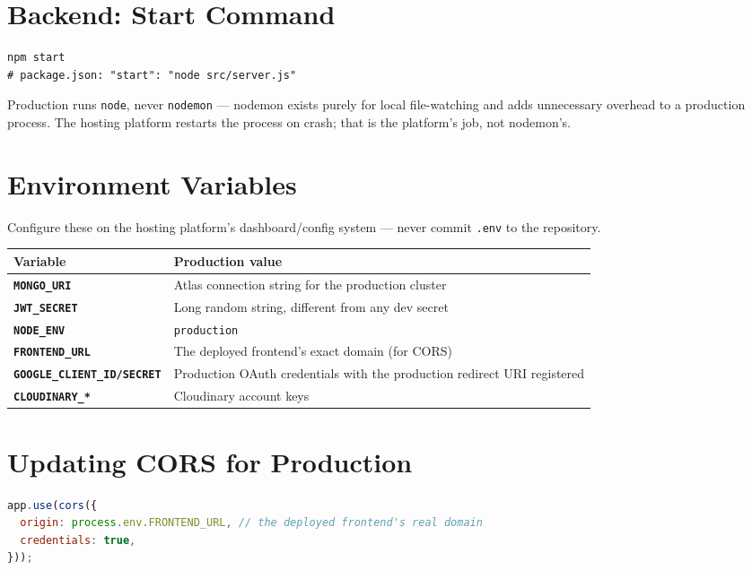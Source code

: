 \section{Backend: Start Command}

\begin{lstlisting}
npm start
# package.json: "start": "node src/server.js"
\end{lstlisting}

Production runs \texttt{node}, never \texttt{nodemon} --- nodemon exists
purely for local file-watching and adds unnecessary overhead to a
production process. The hosting platform restarts the process on crash;
that is the platform's job, not nodemon's.

\section{Environment Variables}

Configure these on the hosting platform's dashboard/config system ---
never commit \texttt{.env} to the repository.

\begin{tabularx}{\textwidth}{@{}>{\bfseries}p{4.2cm}X@{}}
\toprule
Variable & Production value \\
\midrule
\texttt{MONGO\_URI} & Atlas connection string for the production cluster \\
\texttt{JWT\_SECRET} & Long random string, different from any dev secret \\
\texttt{NODE\_ENV} & \texttt{production} \\
\texttt{FRONTEND\_URL} & The deployed frontend's exact domain (for CORS) \\
\texttt{GOOGLE\_CLIENT\_ID/SECRET} & Production OAuth credentials with the
production redirect URI registered \\
\texttt{CLOUDINARY\_*} & Cloudinary account keys \\
\bottomrule
\end{tabularx}

\section{Updating CORS for Production}

\begin{lstlisting}[language=JavaScript]
app.use(cors({
  origin: process.env.FRONTEND_URL, // the deployed frontend's real domain
  credentials: true,
}));
\end{lstlisting}

